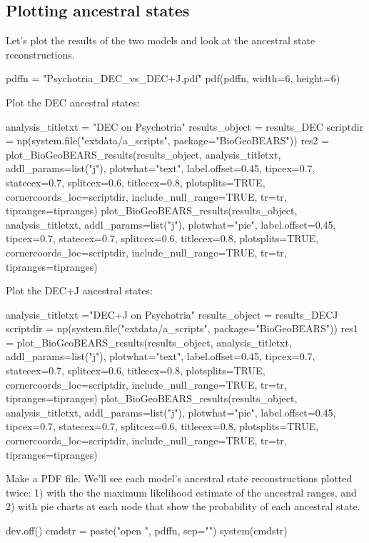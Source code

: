 \documentclass[11pt]{article}
\begin{document}
\subsection{Plotting ancestral states}

Let's plot the results of the two models and look at
the ancestral state reconstructions.
\begin{code}
pdffn = "Psychotria_DEC_vs_DEC+J.pdf"
pdf(pdffn, width=6, height=6)
\end{code}
Plot the DEC ancestral states:
\begin{code}
analysis_titletxt = "DEC on Psychotria"
results_object = results_DEC
scriptdir = np(system.file("extdata/a_scripts", package="BioGeoBEARS"))
res2 = plot_BioGeoBEARS_results(results_object, analysis_titletxt, addl_params=list("j"), plotwhat="text", 
            label.offset=0.45, tipcex=0.7, statecex=0.7, splitcex=0.6, titlecex=0.8, plotsplits=TRUE, 
            cornercoords_loc=scriptdir, include_null_range=TRUE, tr=tr, tipranges=tipranges)
plot_BioGeoBEARS_results(results_object, analysis_titletxt, addl_params=list("j"), plotwhat="pie", 
            label.offset=0.45, tipcex=0.7, statecex=0.7, splitcex=0.6, titlecex=0.8, plotsplits=TRUE, 
            cornercoords_loc=scriptdir, include_null_range=TRUE, tr=tr, tipranges=tipranges)
\end{code}
Plot the DEC+J ancestral states:
\begin{code}
analysis_titletxt ="DEC+J on Psychotria"
results_object = results_DECJ
scriptdir = np(system.file("extdata/a_scripts", package="BioGeoBEARS"))
res1 = plot_BioGeoBEARS_results(results_object, analysis_titletxt, addl_params=list("j"), plotwhat="text", 
            label.offset=0.45, tipcex=0.7, statecex=0.7, splitcex=0.6, titlecex=0.8, plotsplits=TRUE, 
            cornercoords_loc=scriptdir, include_null_range=TRUE, tr=tr, tipranges=tipranges)
plot_BioGeoBEARS_results(results_object, analysis_titletxt, addl_params=list("j"), plotwhat="pie", 
            label.offset=0.45, tipcex=0.7, statecex=0.7, splitcex=0.6, titlecex=0.8, plotsplits=TRUE, 
            cornercoords_loc=scriptdir, include_null_range=TRUE, tr=tr, tipranges=tipranges)
\end{code}
Make a PDF file. We'll see each model's ancestral
state reconstructions plotted twice: 1) with the
the maximum likelihood estimate of the ancestral ranges, and
2) with pie charts at each node that show the probability
of each ancestral state.
\begin{code}
dev.off()
cmdstr = paste("open ", pdffn, sep="")
system(cmdstr)
\end{code}
\end{document}
